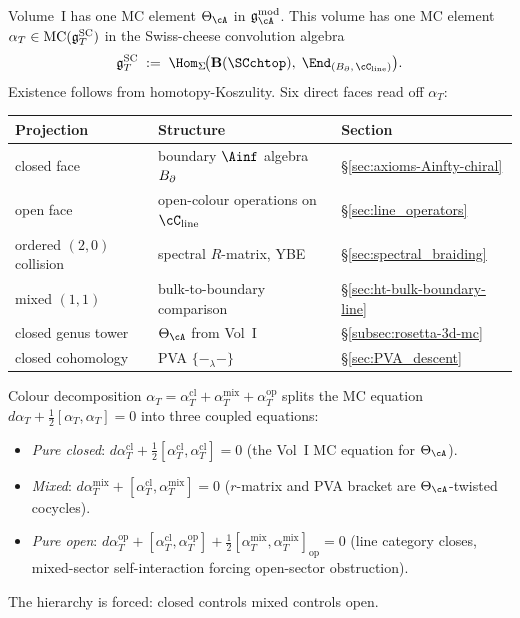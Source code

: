 Volume~I has one MC element $\Theta_\cA$ in $\gAmod$. This
volume has one MC element
$\alpha_T \in \operatorname{MC}(\mathfrak{g}^{\mathrm{SC}}_T)$ in the Swiss-cheese convolution
algebra
\[
\gSC_T
\;:=\;
\Hom_\Sigma\!\bigl(
 \mathbf{B}(\SCchtop),\;
 \End_{(\Bbound,\,\cC_{\mathrm{line}})}
\bigr).
\]
Existence follows from homotopy-Koszulity. Six direct faces
read off $\alpha_T$:
\begin{center}
\small
\renewcommand{\arraystretch}{1.15}
\begin{tabular}{lll}
\textbf{Projection} & \textbf{Structure} & \textbf{Section} \\
\hline
closed face
 & boundary $\Ainf$ algebra $B_{\partial}$
 & \S\ref{sec:axioms-Ainfty-chiral} \\[2pt]
open face
 & open-colour operations on $\cC_{\mathrm{line}}$
 & \S\ref{sec:line_operators} \\[2pt]
ordered $(2,0)$ collision
 & spectral $R$-matrix, YBE
 & \S\ref{sec:spectral_braiding} \\[2pt]
mixed $(1,1)$
 & bulk-to-boundary comparison
 & \S\ref{sec:ht-bulk-boundary-line} \\[2pt]
closed genus tower
 & $\Theta_\cA$ from Vol~I
 & \S\ref{subsec:rosetta-3d-mc} \\[2pt]
closed cohomology
 & PVA $\{-_\lambda -\}$
 & \S\ref{sec:PVA_descent}
\end{tabular}
\end{center}
Colour decomposition
$\alpha_T = \alpha_T^{\mathrm{cl}} + \alpha_T^{\mathrm{mix}}
+ \alpha_T^{\mathrm{op}}$ splits the MC equation
$d\alpha_T + \tfrac{1}{2}[\alpha_T, \alpha_T] = 0$ into three
coupled equations:
\begin{itemize}[nosep]
\item \emph{Pure closed}:
 $d\alpha_T^{\mathrm{cl}}
 + \tfrac{1}{2}[\alpha_T^{\mathrm{cl}}, \alpha_T^{\mathrm{cl}}] = 0$
 (the Vol~I MC equation for $\Theta_\cA$).
\item \emph{Mixed}:
 $d\alpha_T^{\mathrm{mix}}
 + [\alpha_T^{\mathrm{cl}}, \alpha_T^{\mathrm{mix}}] = 0$
 ($r$-matrix and PVA bracket are $\Theta_\cA$-twisted cocycles).
\item \emph{Pure open}:
 $d\alpha_T^{\mathrm{op}}
 + [\alpha_T^{\mathrm{cl}}, \alpha_T^{\mathrm{op}}]
 + \tfrac{1}{2}[\alpha_T^{\mathrm{mix}}, \alpha_T^{\mathrm{mix}}]_{\mathrm{op}} = 0$
 (line category closes, mixed-sector self-interaction forcing
 open-sector obstruction).
\end{itemize}
The hierarchy is forced: closed controls mixed controls open.

